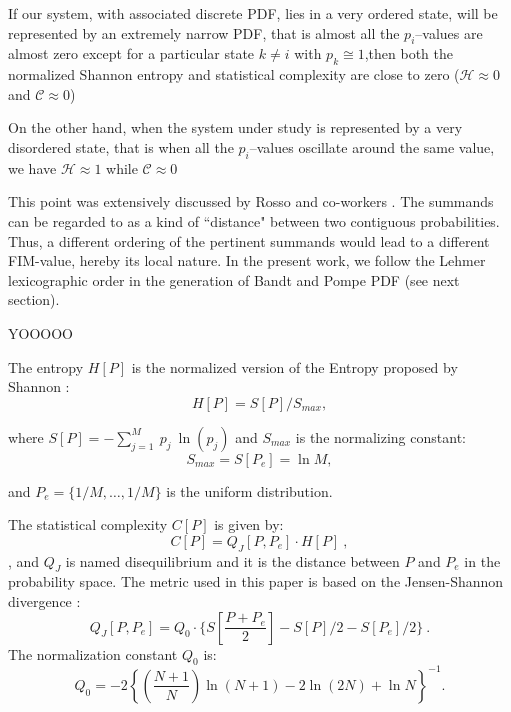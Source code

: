 If our system, with associated discrete PDF, lies in a very ordered state, will be represented
by an extremely narrow PDF, that is almost all the 
$p_{i}$--values are almost zero except for a particular state $k \neq i$ with $p_{k} \cong 1$,then both
the normalized Shannon entropy and statistical complexity are close to zero (${\mathcal H} \approx 0$ and 
${\mathcal C} \approx 0$)

On the other hand, when the system under study is represented by  a very disordered state, that is when all the 
$p_{i}$--values oscillate around the same value, we have ${\mathcal H} \approx 1$ while 
${\mathcal C} \approx 0$

This point was extensively discussed by Rosso and co-workers \cite{Olivares2012A,Olivares2012B}.
The summands can be regarded to as a kind of ``distance" between  two contiguous probabilities.
Thus, a different ordering of the pertinent summands would lead to a different FIM-value, hereby its local nature.
In the present work, we follow the Lehmer lexicographic order \cite{Lehmer} in the generation of Bandt and Pompe 
PDF (see next section).

YOOOOO

The entropy $H[P]$ is the normalized version of the Entropy proposed by Shannon \cite{Shannon1948}:%
%
\begin{equation}\label{eq:sha}
H[P] = S[P] /S_{max},
\end{equation}

\noindent where $S[P]=-\sum _{j=1}^{M}~p_j~\ln( p_j )$ and $S_{max}$ is the normalizing constant:%
%
\begin{equation}
\label{eq:Smax} S_{max}= S[P_e] = \ln M,
\end{equation}

\noindent and $P_e=\{ 1/M, \dots,1/M\}$ is the uniform distribution.

The statistical complexity $C[P]$ is given by:
\begin{equation}
\label{eq:inten}
C[{P}]=Q_{J}[{P,P_e}]\cdot H[{P}] \ ,
\end{equation}
, and
$Q_{J}$ is named disequilibrium and it is the distance between $P$ and $P_e$ in the probability space.
The metric used in this paper is based on the Jensen-Shannon divergence \cite{Lamberti2004}:%
%
\begin{equation}
\label{eq:disequi}
Q_{J}[{P,P_e}]= Q_0 \cdot \{S[\frac{P+P_e}{2}]-S[P]/2-S[P_e]/2 \} \ .
\end{equation}
%
\noindent The normalization constant $Q_0$ is:
\begin{equation}
\label{eq:q0j}
Q_0=-2 \left\{ \left( \frac{N+1}{N} \right) \ln(N+1) - 2 \ln(2N) + \ln N \right\}^{-1} .
\end{equation}

